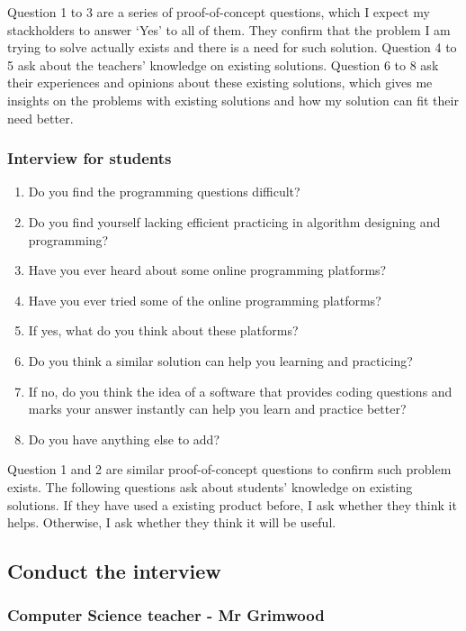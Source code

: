 \documentclass[a4paper]{report}
\begin{document}
Question 1 to 3 are a series of proof-of-concept questions, which I expect my stackholders to answer `Yes' to all of them. They confirm that the problem I am trying to solve actually exists and there is a need for such solution. Question 4 to 5 ask about the teachers' knowledge on existing solutions. Question 6 to 8 ask their experiences and opinions about these existing solutions, which gives me insights on the problems with existing solutions and how my solution can fit their need better.

\subsubsection{Interview for students}

\begin{enumerate}
    \item Do you find the programming questions difficult?
    \item Do you find yourself lacking efficient practicing in algorithm designing and programming?
    \item Have you ever heard about some online programming platforms?
    \item Have you ever tried some of the online programming platforms?
    \item If yes, what do you think about these platforms?
    \item Do you think a similar solution can help you learning and practicing?
    \item If no, do you think the idea of a software that provides coding questions and marks your answer instantly can help you learn and practice better?
    \item Do you have anything else to add?
\end{enumerate}

Question 1 and 2 are similar proof-of-concept questions to confirm such problem exists. The following questions ask about students' knowledge on existing solutions. If they have used a existing product before, I ask whether they think it helps. Otherwise, I ask whether they think it will be useful.

\subsection{Conduct the interview}

\subsubsection{Computer Science teacher - Mr Grimwood}
\end{document}
